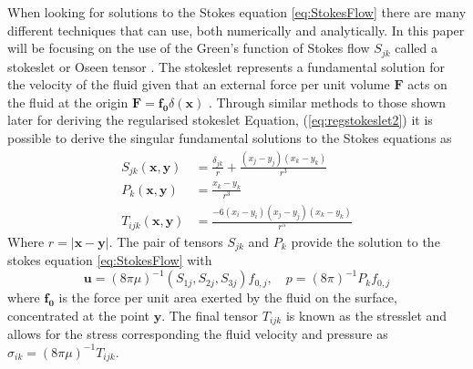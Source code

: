 When looking for solutions to the Stokes equation \cref{eq:StokesFlow} there are many different techniques that can use, both numerically and analytically. In this paper will be focusing on the use of the Green's function of Stokes flow $S_{jk}$ called a stokeslet \cite{Pozrikidis1992BoundaryFlow,Hancock1953TheLiquids} or Oseen tensor \cite{Oseen1927NeuereHydrodynamik}. The stokeslet represents a fundamental solution for the velocity of the fluid given that an external force per unit volume $\bm{F}$ acts on the fluid at the origin $\bm{F} = \bm{f_0}\delta(\bm{x})$ \cite{Hancock1953TheLiquids, Batchelor2000AnDynamics}.
Through similar methods to those shown later for deriving the regularised stokeslet Equation, (\cref{eq:regstokeslet2}) it is possible to derive the singular fundamental solutions to the Stokes equations as
\begin{equation}
\label{eq:singularsolutions}
\begin{aligned}
    S_{j k}(\bm{x}, \bm{y}) &= \frac{\delta_{j k}}{r}+\frac{\left(x_{j}-y_{j}\right)\left(x_{k}-y_{k}\right)}{r^{3}} \\
    P_{k}(\bm{x}, \bm{y}) &= \frac{x_{k}-y_{k}}{r^{3}} \\
    T_{ijk}(\bm{x}, \bm{y}) &= \frac{-6\left(x_{i}-y_{i}\right)\left(x_{j}-y_{j}\right)\left(x_{k}-y_{k}\right)}{r^5}
\end{aligned}
\end{equation}
Where $r=|\bm{x}-\bm{y}|$. The pair of tensors $S_{jk}$ and $P_k$ provide the solution to the stokes equation \cref{eq:StokesFlow} with
\begin{equation*}
    \mathbf{u} = (8 \pi \mu)^{-1} \left(S_{1j},S_{2j},S_{3j}\right)f_{0,j}, \quad p = (8 \pi)^{-1} P_k f_{0,j} 
\end{equation*}
where $\bm{f_{0}}$ is the force per unit area exerted by the fluid on the surface, concentrated at the point $\bm{y}$. The final tensor $T_{ijk}$ is known as the stresslet and allows for the stress corresponding the fluid velocity and pressure as $\sigma_{ik}=(8 \pi \mu)^{-1}T_{ijk}$. 

